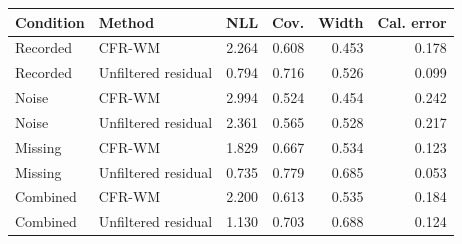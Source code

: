 \begin{tabular}{llrrrr}
\toprule
Condition & Method & NLL & Cov. & Width & Cal. error \\
\midrule
Recorded & CFR-WM & 2.264 & 0.608 & 0.453 & 0.178 \\
Recorded & Unfiltered residual & 0.794 & 0.716 & 0.526 & 0.099 \\
Noise & CFR-WM & 2.994 & 0.524 & 0.454 & 0.242 \\
Noise & Unfiltered residual & 2.361 & 0.565 & 0.528 & 0.217 \\
Missing & CFR-WM & 1.829 & 0.667 & 0.534 & 0.123 \\
Missing & Unfiltered residual & 0.735 & 0.779 & 0.685 & 0.053 \\
Combined & CFR-WM & 2.200 & 0.613 & 0.535 & 0.184 \\
Combined & Unfiltered residual & 1.130 & 0.703 & 0.688 & 0.124 \\
\bottomrule
\end{tabular}
